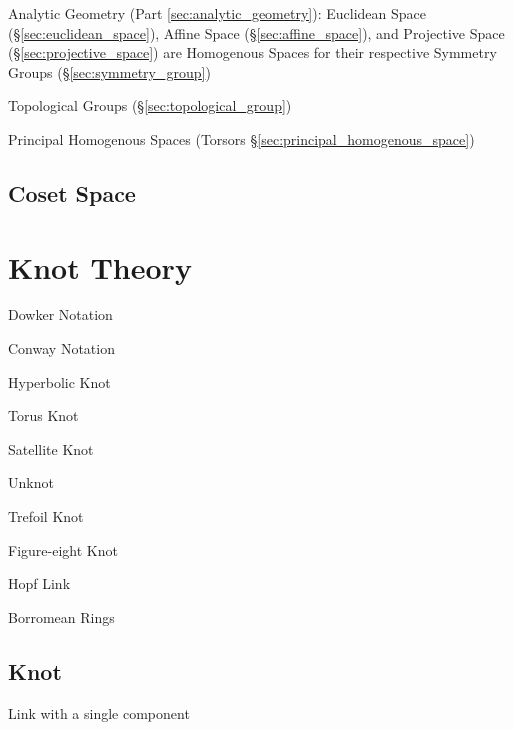 Analytic Geometry (Part \ref{sec:analytic_geometry}): Euclidean Space
(\S\ref{sec:euclidean_space}), Affine Space (\S\ref{sec:affine_space}), and
Projective Space (\S\ref{sec:projective_space}) are Homogenous Spaces for their
respective Symmetry Groups (\S\ref{sec:symmetry_group})

Topological Groups (\S\ref{sec:topological_group})

Principal Homogenous Spaces (Torsors \S\ref{sec:principal_homogenous_space})



\subsection{Coset Space}\label{sec:coset_space}



\section{Knot Theory} \label{sec:knot_theory}

Dowker Notation

Conway Notation



Hyperbolic Knot

Torus Knot

Satellite Knot



Unknot

Trefoil Knot

Figure-eight Knot

Hopf Link

Borromean Rings



\subsection{Knot} \label{sec:knot}

Link with a single component %



